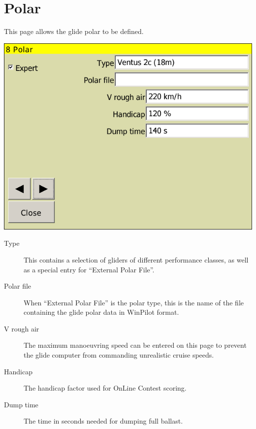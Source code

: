 \documentclass[a4paper,12pt]{refrep}
\begin{document}
\clearpage
\section{Polar}

This page allows the glide polar to be defined.

\begin{center}
\includegraphics[angle=0,width=\linewidth,keepaspectratio='true']{figures/config-polar.png}
\end{center}

\begin{description}
\item[Type]  \label{conf:polar} This contains a selection of gliders of
different performance classes, as well as a special entry for ``External Polar File''.  
\item[Polar file]  When ``External Polar File'' is the polar type, 
 this is the name of the file containing the glide polar data in WinPilot
 format.
\item[V rough air] The maximum manoeuvring speed can be entered on this page to prevent the glide computer from commanding unrealistic cruise speeds.
\item[Handicap] The handicap factor used for OnLine Contest scoring.
\item[Dump time] The time in seconds needed for dumping full ballast.
\end{description}
\end{document}
